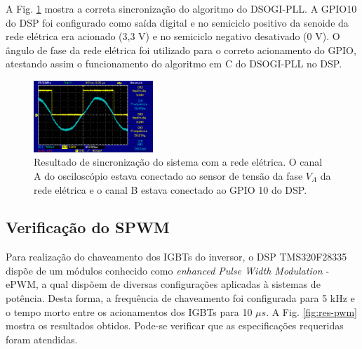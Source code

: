 A Fig. \ref{fig:res-sincronizacao} mostra a correta sincronização do algoritmo do DSOGI-PLL. 
A GPIO10 do DSP foi configurado como saída digital e no semiciclo positivo da senoide da rede elétrica era acionado (3,3 V) e no semiciclo negativo desativado (0 V).
O ângulo de fase da rede elétrica foi utilizado para o correto acionamento do GPIO, atestando assim o funcionamento do algoritmo em C do DSOGI-PLL no DSP.

\begin{figure}[!hbt]
	\begin{center}
    \includegraphics[width=0.4\textwidth]{figuras/resultados_sincronizacao.png}
	\caption{Resultado de sincronização do sistema com a rede elétrica. O canal A do osciloscópio estava conectado ao sensor de tensão da fase $V_A$ da rede elétrica e o canal B estava conectado ao GPIO 10 do DSP.}
    \label{fig:res-sincronizacao}
    \end{center}
\end{figure}

\subsection{Verificação do SPWM}

Para realização do chaveamento dos IGBTs do inversor, o DSP TMS320F28335 dispõe
de um módulos conhecido como \textit{enhanced Pulse Width Modulation} - ePWM, a qual dispõem de diversas configurações aplicadas à sistemas de potência.
Desta forma, a frequência de chaveamento foi configurada para 5 kHz e o tempo morto entre os acionamentos dos IGBTs para 10 $\mu s$. 
A Fig. \ref{fig:res-pwm} mostra os resultados obtidos. Pode-se verificar que as especificações requeridas foram atendidas.

